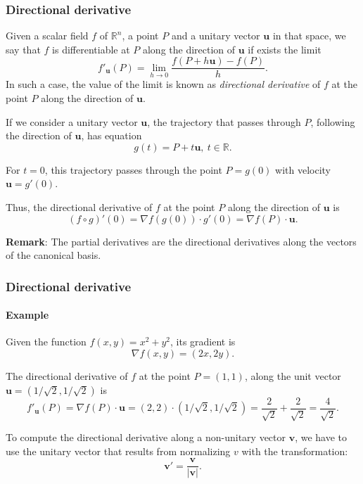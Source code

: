 \begin{frame}
\frametitle{Directional derivative}
\begin{definition}
Given a scalar field $f$ of $\mathbb{R}^n$, a point $P$ and a unitary vector $\mathbf{u}$ in that space, we say that $f$ is differentiable at $P$ along the direction of $\mathbf{u}$ if exists the limit
\[
f'_{\mathbf{u}}(P) = \lim_{h\rightarrow 0}\frac{f(P+h\mathbf{u})-f(P)}{h}.
\]
In such a case, the value of the limit is known as \emph{directional derivative} of $f$ at the point $P$ along the direction of $\mathbf{u}$.
\end{definition}

If we consider a unitary vector $\mathbf{u}$, the trajectory that passes through $P$, following the direction of $\mathbf{u}$, has equation
\[
g(t)=P+t\mathbf{u},\ t\in\mathbb{R}.
\]

For $t=0$, this trajectory passes through the point $P=g(0)$ with velocity $\mathbf{u}=g'(0)$.

Thus, the directional derivative of $f$ at the point $P$ along the direction of $\mathbf{u}$ is
\[
(f\circ g)'(0) = \nabla f(g(0))\cdot g'(0) = \nabla f(P)\cdot \mathbf{u}.
\]

\textbf{Remark}: The partial derivatives are the directional derivatives along the vectors of the canonical basis.
\end{frame}


\begin{frame}
\frametitle{Directional derivative}
\framesubtitle{Example}
Given the function $f(x,y) = x^2+y^2$, its gradient is
\[
\nabla f(x,y) = (2x,2y).
\]

The directional derivative of $f$ at the point $P=(1,1)$, along the unit vector $\mathbf{u}=(1/\sqrt{2},1/\sqrt{2})$ is
\[
f'_{\mathbf{u}}(P) = \nabla f(P)\cdot \mathbf{u} = (2,2)\cdot(1/\sqrt{2},1/\sqrt{2}) = \frac{2}{\sqrt{2}}+\frac{2}{\sqrt{2}} = \frac{4}{\sqrt{2}}.
\]

To compute the directional derivative along a non-unitary vector $\mathbf{v}$, we have to use the unitary vector that results from normalizing $v$ with the transformation:
\[
\mathbf{v'}=\frac{\mathbf{v}}{|\mathbf{v}|}.
\]
\end{frame}


